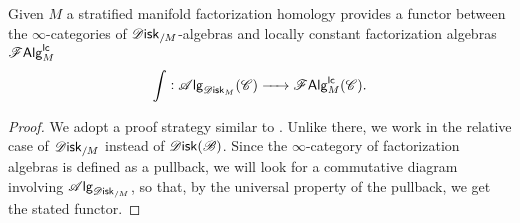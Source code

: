 \documentclass[../text]{subfiles}
\begin{document}
\begin{proposition}\label{prop:fh_disk_to_lcfa}
    Given $M$ a stratified manifold factorization homology provides a functor between the $\infty$-categories of $\disk_{/M}$-algebras and locally constant factorization algebras $\mathscr{F} \mathsf{Alg}^{\mathsf{lc}}_M$
    \begin{equation}
        \int : \alg{\disk_M} (\catC) \xrightarrow{\ \ \ \ } \lcfa_M (\catC).
    \end{equation}
\end{proposition}

\begin{proof}
    We adopt a proof strategy similar to \cite[prop.3.14]{af_primer}. Unlike there, we work in the relative case of $\disk_{/M}$ instead of $\disk(\bstr)$. Since the $\infty$-category of factorization algebras is defined as a pullback, we will look for a commutative diagram involving $\alg{\disk_{/M}}$, so that, by the universal property of the pullback, we get the stated functor.
    

\end{proof}
\end{document}
